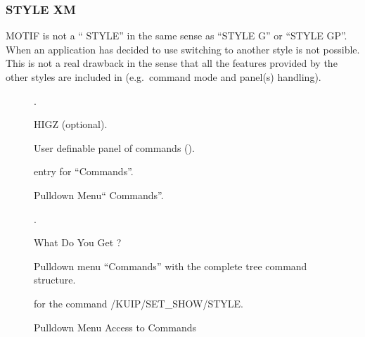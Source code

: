 \subsubsection{STYLE XM}

MOTIF is not a ``\KUIP{} STYLE'' in the same sense as ``STYLE G'' or ``STYLE GP''.
When an application has decided to use \KUIPMotif{} switching to another
style is not possible. This is not a real drawback in the sense that
all the features provided by the other styles are included in \KUIPMotif{} 
(e.g.\ command mode and panel(s) handling).

\begin{figure}[tb]
\vspace{-.5cm}
\vspace{-1cm}
\caption{What Do You Get ?}
\label{ref:FIGPKMF1}
\vspace{-.5cm}
\begin{EnumZB}
\item \EW{}
\item \MB{}.
\item HIGZ \GW{} (optional).
\item User definable panel of commands (\PNI{}).
\end{EnumZB}
\begin{EnumZW}
\item \MB{} entry for ``Commands''.
\item Pulldown Menu`` Commands''.
\item \INP{}.
\end{EnumZW}
\vspace{-.5cm}
\vspace{10pt}
\end{figure}

\begin{figure}[tb]
\caption{Pulldown Menu Access to Commands}
\label{ref:FIGPKMF2}
\begin{EnumZB}
\item Pulldown menu ``Commands'' with the complete tree command structure.
\item \CAP{} for the \KUIP{} command /KUIP/SET\_SHOW/STYLE.
\end{EnumZB}
\end{figure}


